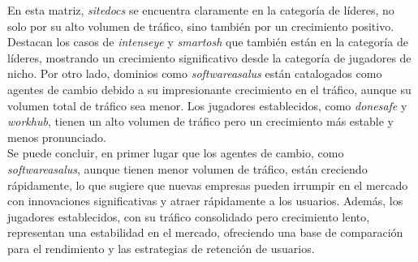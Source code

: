 En esta matriz, \textit{sitedocs} se encuentra claramente en la categoría de líderes, no solo por su alto volumen de tráfico, sino también por un crecimiento positivo. Destacan los casos de \textit{intenseye} y \textit{smartosh} que también están en la categoría de líderes, mostrando un crecimiento significativo desde la categoría de jugadores de nicho. Por otro lado, dominios como \textit{softwareasalus} están catalogados como agentes de cambio debido a su impresionante crecimiento en el tráfico, aunque su volumen total de tráfico sea menor. Los jugadores establecidos, como \textit{donesafe} y \textit{workhub}, tienen un alto volumen de tráfico pero un crecimiento más estable y menos pronunciado.\\ \indent
Se puede concluir, en primer lugar que los agentes de cambio, como \textit{softwareasalus}, aunque tienen menor volumen de tráfico, están creciendo rápidamente, lo que sugiere que nuevas empresas pueden irrumpir en el mercado con innovaciones significativas y atraer rápidamente a los usuarios. Además, los jugadores establecidos, con su tráfico consolidado pero crecimiento lento, representan una estabilidad en el mercado, ofreciendo una base de comparación para el rendimiento y las estrategias de retención de usuarios.

